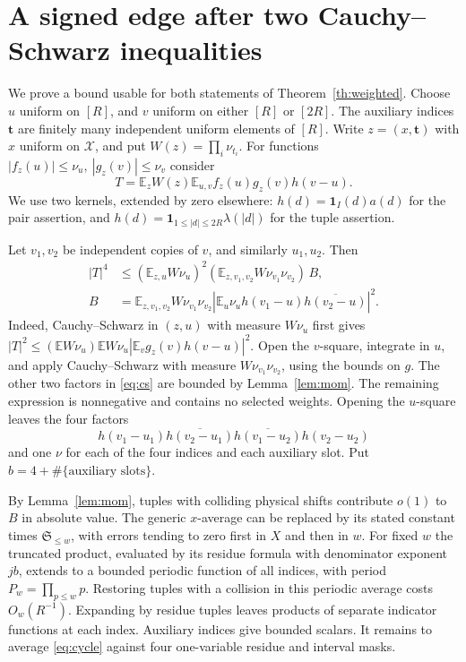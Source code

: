 \documentclass[11pt]{article}
\newcommand{\E}{\mathbb E}
\newcommand{\one}{\mathbf 1}
\newcommand{\Sf}{\mathfrak S}
\begin{document}
\section{A signed edge after two Cauchy--Schwarz inequalities}
We prove a bound usable for both statements of Theorem~\ref{th:weighted}.
Choose \(u\) uniform on \([R]\), and \(v\) uniform on either \([R]\) or
\([2R]\). The auxiliary indices \(\mathbf t\) are finitely many independent
uniform elements of \([R]\). Write \(z=(x,\mathbf t)\) with \(x\) uniform
on \(\mathcal X\), and put \(W(z)=\prod_i\nu_{t_i}\).
For functions \(|f_z(u)|\le\nu_u,\ |g_z(v)|\le\nu_v\) consider
\[
       T=\E_z W(z)\E_{u,v} f_z(u)g_z(v) h(v-u).
\]
We use two kernels, extended by zero elsewhere:
\(h(d)=\one_I(d)a(d)\) for the pair assertion, and
\(h(d)=\one_{1\le|d|\le 2R}\lambda(|d|)\) for the tuple assertion.

Let \(v_1,v_2\) be independent copies of \(v\), and similarly \(u_1,u_2\).
Then
\begin{align}
 |T|^4&\le (\E_{z,u}W\nu_u)^2
       (\E_{z,v_1,v_2}W\nu_{v_1}\nu_{v_2})\, B, \label{eq:cs}\\
 B&=\E_{z,v_1,v_2}W\nu_{v_1}\nu_{v_2}
 \left|\E_u \nu_u h(v_1-u)\overline{h(v_2-u)}\right|^2. \nonumber
\end{align}
Indeed, Cauchy--Schwarz in \((z,u)\) with measure \(W\nu_u\) first gives
\(|T|^2\le(\E W\nu_u)\E W\nu_u|\E_v g_z(v)h(v-u)|^2\).
Open the \(v\)-square, integrate in \(u\), and apply Cauchy--Schwarz with
measure \(W\nu_{v_1}\nu_{v_2}\), using the bounds on \(g\).
The other two factors in \eqref{eq:cs} are bounded by Lemma~\ref{lem:mom}.
The remaining expression is nonnegative and contains no selected weights.
Opening the \(u\)-square leaves the four factors
\begin{equation}\label{eq:cycle}
 h(v_1-u_1)\overline{h(v_2-u_1)}
 \overline{h(v_1-u_2)}h(v_2-u_2)
\end{equation}
and one \(\nu\) for each of the four indices and each auxiliary slot.
Put \(b=4+\#\{\text{auxiliary slots}\}\).

By Lemma~\ref{lem:mom}, tuples with colliding physical shifts contribute
\(o(1)\) to \(B\) in absolute value. The generic \(x\)-average can be
replaced by its stated constant times \(\Sf_{\le w}\), with errors tending
to zero first in \(X\) and then in \(w\). For fixed \(w\) the truncated
product, evaluated by its residue formula with denominator exponent \(jb\),
extends to a bounded periodic function of all indices, with period
\(P_w=\prod_{p\le w}p\). Restoring tuples with a collision in this periodic
average costs \(O_w(R^{-1})\). Expanding by residue tuples leaves products
of separate indicator functions at each index. Auxiliary indices give
bounded scalars. It remains to average \eqref{eq:cycle} against four
one-variable residue and interval masks.
\end{document}
